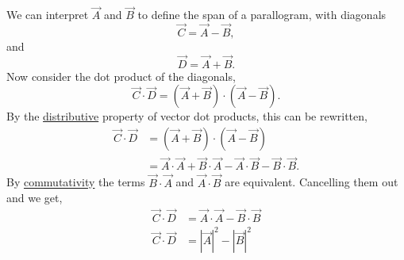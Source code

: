 \documentclass[main.tex]{subfiles}
\begin{document}
{We can interpret $\vec{A}$ and $\vec{B}$ to define the span of a parallogram,
with diagonals \[\vec{C} = \vec{A} - \vec{B},\] 
and \[\vec{D} = \vec{A} + \vec{B}.\]
Now consider the dot product of the diagonals,
\[\vec{C}\cdot\vec{D} = (\vec{A} + \vec{B}) \cdot (\vec{A} - \vec{B}).\]
By the \href{\wikidprod}{distributive} property of vector dot products, 
this can be rewritten,
\begin{align*}
\vec{C}\cdot\vec{D} &= (\vec{A} + \vec{B}) \cdot (\vec{A} - \vec{B})\\
&= \vec{A}\cdot \vec{A} + \vec{B}\cdot \vec{A} 
-\vec{A}\cdot \vec{B} - \vec{B}\cdot \vec{B}.
\end{align*}
By \href{\wikidprod}{commutativity} the terms $\vec{B}\cdot\vec{A}$ and
$\vec{A}\cdot\vec{B}$ are equivalent. Cancelling them out and we get,
\begin{align*}
\vec{C}\cdot\vec{D} &= \vec{A}\cdot \vec{A} - \vec{B}\cdot \vec{B}\\
\vec{C}\cdot\vec{D} &= |\vec{A}|^2 - |\vec{B}|^2
\end{align*}

}
\end{document}
